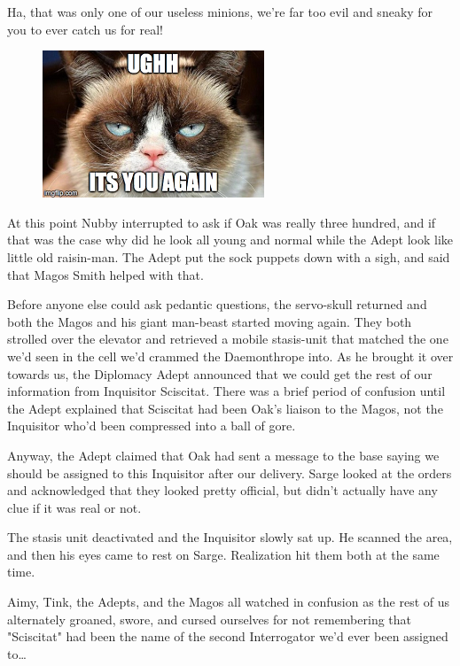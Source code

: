 

Ha, that was only one of our useless minions, we're far too evil and sneaky for you to ever catch us for real!



\begin{figure}
	\begin{center}
		\includegraphics[width=\figwidth]{pics/16/69.png}
	\end{center}
\end{figure}
At this point Nubby interrupted to ask if Oak was really three hundred, and if that was the case why did he look all young and normal while the Adept look like little old raisin-man. 
The Adept put the sock puppets down with a sigh, and said that Magos Smith helped with that.

Before anyone else could ask pedantic questions, the servo-skull returned and both the Magos and his giant man-beast started moving again. 
They both strolled over the elevator and retrieved a mobile stasis-unit that matched the one we'd seen in the cell we'd crammed the Daemonthrope into. 
As he brought it over towards us, the Diplomacy Adept announced that we could get the rest of our information from Inquisitor Sciscitat. 
There was a brief period of confusion until the Adept explained that Sciscitat had been Oak's liaison to the Magos, not the Inquisitor who'd been compressed into a ball of gore.

Anyway, the Adept claimed that Oak had sent a message to the base saying we should be assigned to this Inquisitor after our delivery. 
Sarge looked at the orders and acknowledged that they looked pretty official, but didn't actually have any clue if it was real or not.

The stasis unit deactivated and the Inquisitor slowly sat up. 
He scanned the area, and then his eyes came to rest on Sarge. 
Realization hit them both at the same time.



Aimy, Tink, the Adepts, and the Magos all watched in confusion as the rest of us alternately groaned, swore, and cursed ourselves for not remembering that "Sciscitat" had been the name of the second Interrogator we'd ever been assigned to…
